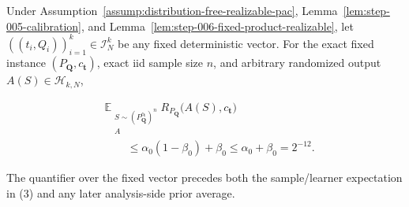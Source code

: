\begin{proposition}\label{prop:step-006-pointwise-pac-expectation}
Under Assumption~\ref{assump:distribution-free-realizable-pac}, Lemma~\ref{lem:step-005-calibration}, and
Lemma~\ref{lem:step-006-fixed-product-realizable}, let
\(((t_i,Q_i))_{i=1}^k\in\mathcal I_N^k\) be any fixed deterministic
vector. For the exact fixed instance
\((P_{\boldsymbol Q},c_{\boldsymbol t})\), exact iid sample size \(n\),
and arbitrary randomized output \(A(S)\in\mathcal H_{k,N}\),

\[
\begin{aligned}
&\mathbb E_{\substack{S\sim
  (P_{\boldsymbol Q}^{c_{\boldsymbol t}})^n\\ A}}
  R_{P_{\boldsymbol Q}}\bigl(A(S),c_{\boldsymbol t}\bigr)\\
&\qquad\le
  \alpha_0(1-\beta_0)+\beta_0
  \le\alpha_0+\beta_0
  =2^{-12}.
\end{aligned}
\tag{3}
\]

The quantifier over the fixed vector precedes both the sample/learner
expectation in (3) and any later analysis-side prior average.
\end{proposition}


